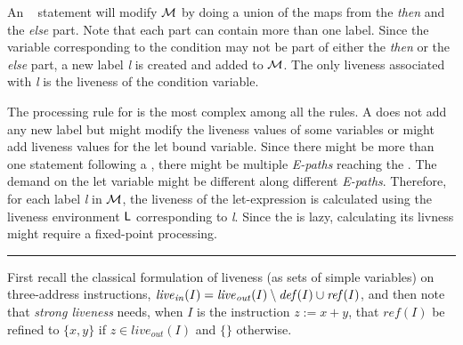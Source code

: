 \documentclass{sig-alternate}
\begin{document}
  An \SIF~ statement will modify  $\cal{M}$ by doing a union of 
  the maps from the {\em then} and the {\em else} part. Note that each part can contain 
  more than one label. Since the variable corresponding to the condition may not
  be part of either the {\em then} or the {\em else} part, a new label {\em l} is created 
  and added to $\cal{M}$. The only liveness associated with {\em l} is the liveness 
  of the condition variable.
  
  The processing rule for {\LET} is the most complex among all the rules. A {\LET} does
  not add any new label but might modify the liveness values of some variables or might add 
  liveness values for the let bound variable. Since there might be more than one {\RETURN} 
  statement following a {\LET}, there might be multiple {\em E-paths} reaching the {\LET}.
  The demand on the let variable might be different along different {\em E-paths}. Therefore,
  for each label {\em l} in $\cal{M}$, the liveness of the let-expression is calculated using 
  the liveness environment $\mathsf{L}$ corresponding to {\em l}. Since the {\LET} is lazy, 
  calculating its livness might require a fixed-point processing. 
  

\bigskip
\hrule 
\bigskip

First recall the classical formulation  of liveness (as sets of simple
variables)        on        three-address       instructions,        $
\mathit{live}_\mathit{in}(I) = \mathit{live}_\mathit{out}(I) \setminus
\mathit{def\/}(I) \cup  \mathit{ref\/}(I) $,  and then note  that {\em
  strong liveness}  needs, when $I$ is the  instruction $z:=x+y$, that
$\mathit{ref}(I)$     be     refined     to    $\{x,y\}$     if     $z
\in\mathit{live}_\mathit{out}(I)$ and $\{\}$ otherwise.
\end{document}
